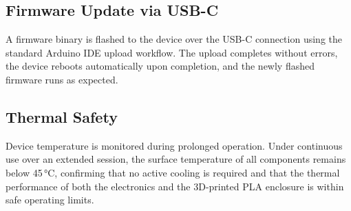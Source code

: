 \subsection{Firmware Update via USB-C}

A firmware binary is flashed to the device over the USB-C connection using the standard Arduino IDE upload workflow. The upload completes without errors, the device reboots automatically upon completion, and the newly flashed firmware runs as expected.

\subsection{Thermal Safety}

Device temperature is monitored during prolonged operation. Under continuous use over an extended session, the surface temperature of all components remains below 45\,°C, confirming that no active cooling is required and that the thermal performance of both the electronics and the 3D-printed PLA enclosure is within safe operating limits.